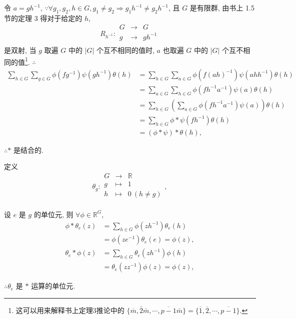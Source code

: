 \documentclass{ctexart}
\begin{document}
\begin{example}
    令 $a=gh^{-1}$, $\because\forall g_1,g_2,h\in G, g_1\neq g_2\Rightarrow g_1h^{-1}\neq g_2h^{-1}$, 且 $G$ 是有限群, 由书上 1.5 节的定理 3 得对于给定的 $h$,
    \[R_{h^{-1}}:\begin{array}{rcl}
        G & \to & G \\
        g & \to & gh^{-1} \\
    \end{array}\]
    是双射, 当 $g$ 取遍 $G$ 中的 $|G|$ 个互不相同的值时, $a$ 也取遍 $G$ 中的 $|G|$ 个互不相同的值\footnote{这可以用来解释书上定理3推论中的 $\{\overline{m},\bar{2}\bar{m},\cdots,\overline{p-1}\bar{m}\}=\{\overline{1},\overline{2},\cdots,\overline{p-1}\}$.}. $\therefore$
    \begin{align*}
        \sum\limits_{h\in G}\sum\limits_{g\in G}\phi(fg^{-1})\psi(gh^{-1})\theta(h) & =\sum\limits_{h\in G}\sum\limits_{a\in G}\phi(f(ah)^{-1})\psi(ahh^{-1})\theta(h) \\
        & =\sum\limits_{a\in G}\sum\limits_{h\in G}\phi(fh^{-1}a^{-1})\psi(a)\theta(h) \\
        & =\sum\limits_{h\in G}\left(\sum\limits_{a\in G}\phi(fh^{-1}a^{-1})\psi(a)\right)\theta(h) \\
        & =\sum\limits_{h\in G}\phi*\psi(fh^{-1})\theta(h) \\
        & =(\phi*\psi)*\theta(h),
    \end{align*}

    $\therefore*$ 是结合的.

    定义
    \[\theta_g:\begin{array}{rcl}
        G & \to & \mathbb{R} \\
        g & \mapsto & 1 \\
        h & \mapsto & 0\ (h\neq g) \\
    \end{array},\]

    设 $e$ 是 $g$ 的单位元, 则 $\forall\phi\in\mathbb{R}^G$,
    \begin{align*}
        \phi*\theta_e(z) & =\sum\limits_{h\in G}\phi(zh^{-1})\theta_e(h) \\
        & =\phi(ze^{-1})\theta_e(e)=\phi(z), \\
        \theta_e*\phi(z) & =\sum\limits_{h\in G}\theta_e(zh^{-1})\phi(h) \\
        & =\theta_e(zz^{-1})\phi(z)=\phi(z),
    \end{align*}

    $\therefore\theta_e$ 是 $*$ 运算的单位元.


\end{example}
\end{document}
